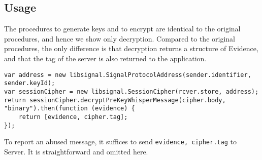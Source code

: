 \documentclass{article}
\begin{document}
\subsection{Usage}
\label{sec:usage}

The procedures to generate keys and to encrypt are 
identical to the original procedures,
and hence we show only decryption.
Compared to the original procedures,
the only difference is that decryption returns a structure of Evidence,
and that the tag of the server is also returned to 
the application.
{\small
\begin{verbatim}
var address = new libsignal.SignalProtocolAddress(sender.identifier, sender.keyId);
var sessionCipher = new libsignal.SessionCipher(rcver.store, address);
return sessionCipher.decryptPreKeyWhisperMessage(cipher.body, "binary").then(function (evidence) {
    return [evidence, cipher.tag];
});
\end{verbatim}
}
To report an abused message, 
it suffices to send {\tt evidence, cipher.tag} to Server.
It is straightforward and omitted here.
















\end{document}
